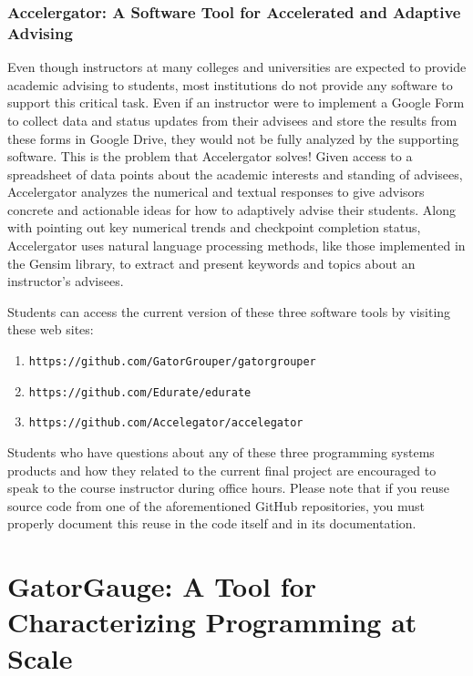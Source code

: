 \documentclass[11pt]{article}
\newcommand{\url}[1]{\lstinline{#1}}
\begin{document}
\subsubsection*{Accelergator: A Software Tool for Accelerated and Adaptive Advising}

Even though instructors at many colleges and universities are expected to provide academic advising to students, most
institutions do not provide any software to support this critical task. Even if an instructor were to implement a Google
Form to collect data and status updates from their advisees and store the results from these forms in Google Drive, they
would not be fully analyzed by the supporting software. This is the problem that Accelergator solves! Given access to a
spreadsheet of data points about the academic interests and standing of advisees, Accelergator analyzes the numerical
and textual responses to give advisors concrete and actionable ideas for how to adaptively advise their students. Along
with pointing out key numerical trends and checkpoint completion status, Accelergator uses natural language processing
methods, like those implemented in the Gensim library, to extract and present keywords and topics about an instructor's
advisees.

\noindent
Students can access the current version of these three software tools by visiting these web sites:

\begin{enumerate}
  \item \url{https://github.com/GatorGrouper/gatorgrouper}
  \item \url{https://github.com/Edurate/edurate}
  \item \url{https://github.com/Accelegator/accelegator}
\end{enumerate}

\noindent Students who have questions about any of these three programming systems products and how they related to the
current final project are encouraged to speak to the course instructor during office hours. Please note that if you
reuse source code from one of the aforementioned GitHub repositories, you must properly document this reuse in the code
itself and in its documentation.

\section*{GatorGauge: A Tool for Characterizing Programming at Scale}
\end{document}
